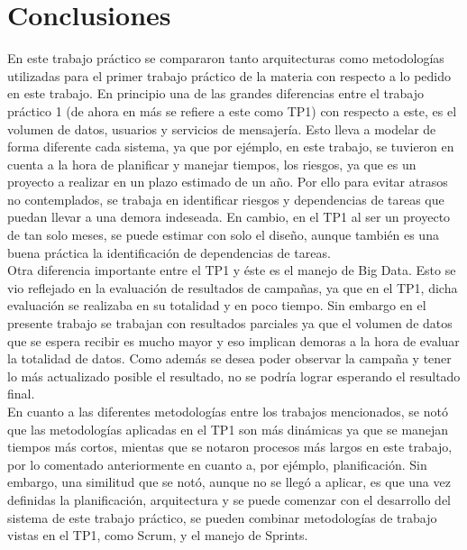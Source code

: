 \section{Conclusiones}

En este trabajo pr\'actico se compararon tanto arquitecturas como metodolog\'ias utilizadas para el primer trabajo pr\'actico de la materia con respecto a lo pedido en este trabajo.
En principio una de las grandes diferencias entre el trabajo pr\'actico 1 (de ahora en m\'as se refiere a este como TP1) con respecto a este, es el volumen de datos, usuarios y servicios de mensajer\'ia. Esto lleva a modelar de forma diferente cada sistema, ya que por ej\'emplo, en este trabajo, se tuvieron en cuenta a la hora de planificar y manejar tiempos, los riesgos, ya que es un proyecto a realizar en un plazo estimado de un a\~no. Por ello para evitar atrasos no contemplados, se trabaja en identificar riesgos y dependencias de tareas que puedan llevar a una demora indeseada. En cambio, en el TP1 al ser un proyecto de tan solo meses, se puede estimar con solo el dise\~no, aunque tambi\'en es una buena pr\'actica la identificaci\'on de dependencias de tareas. \\
Otra diferencia importante entre el TP1 y \'este es el manejo de Big Data. Esto se vio reflejado en la evaluaci\'on de resultados de campa\~nas, ya que en el TP1, dicha evaluaci\'on se realizaba en su totalidad y en poco tiempo. Sin embargo en el presente trabajo se trabajan con resultados parciales ya que el volumen de datos que se espera recibir es mucho mayor y eso implican demoras a la hora de evaluar la totalidad de datos. Como adem\'as se desea poder observar la campa\~na y tener lo m\'as actualizado posible el resultado, no se podr\'ia lograr esperando el resultado final. \\
En cuanto a las diferentes metodolog\'ias entre los trabajos mencionados, se not\'o que las metodolog\'ias aplicadas en el TP1 son m\'as din\'amicas ya que se manejan tiempos m\'as cortos, mientas que se notaron procesos m\'as largos en este trabajo, por lo comentado anteriormente en cuanto a, por ej\'emplo, planificaci\'on. Sin embargo, una similitud que se not\'o, aunque no se lleg\'o a aplicar, es que una vez definidas la planificaci\'on, arquitectura y se puede comenzar con el desarrollo del sistema de este trabajo pr\'actico, se pueden combinar metodolog\'ias de trabajo vistas en el TP1, como Scrum, y el manejo de Sprints.